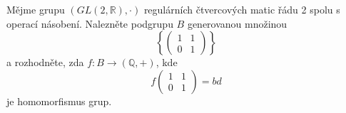 \subsubsection{}
Mějme grupu $(GL(2,\mathbb{R}), \cdot)$ regulárních čtvercových matic řádu 2
spolu s operací násobení. Nalezněte podgrupu $B$ generovanou množinou 
$$\left \{ \begin{pmatrix}
 1& 1\\ 
 0&1 
\end{pmatrix} \right \}$$
a rozhodněte, zda $f:B \rightarrow (\mathbb{Q}, +)$, kde 
$$f\begin{pmatrix}
 1& 1\\ 
 0&1 
\end{pmatrix} =bd$$ je homomorfismus grup.
